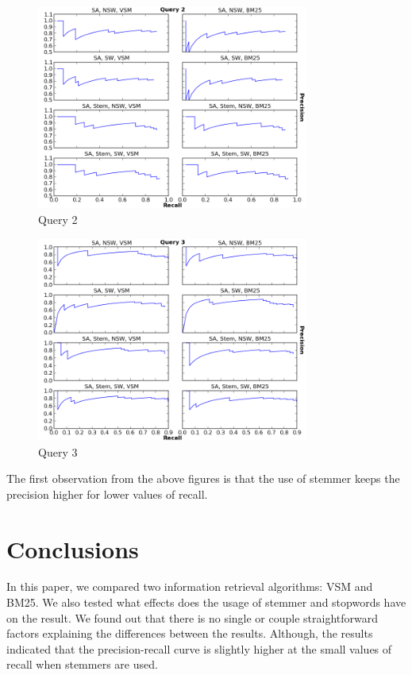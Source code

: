 \begin{figure}[ht]
  \centering
  \includegraphics[width=0.8\textwidth]{Query2.png}
  \caption{Query 2 }
  \label{fig:Query2}
\end{figure}
\FloatBarrier

\begin{figure}[ht]
  \centering
  \includegraphics[width=0.8\textwidth]{Query3.png}
  \caption{Query 3 }
  \label{fig:Query3}
\end{figure}
\FloatBarrier


The first observation from the above figures is that the use of stemmer keeps the precision higher for lower values of recall. 

\section{Conclusions}


In this paper, we compared two information retrieval algorithms: VSM and BM25. We also tested what effects does the usage of stemmer and stopwords have on the result. We found out that there is no single or couple straightforward factors explaining the differences between the results. Although, the results indicated that the precision-recall curve is slightly higher at the small values of recall when stemmers are used. 

